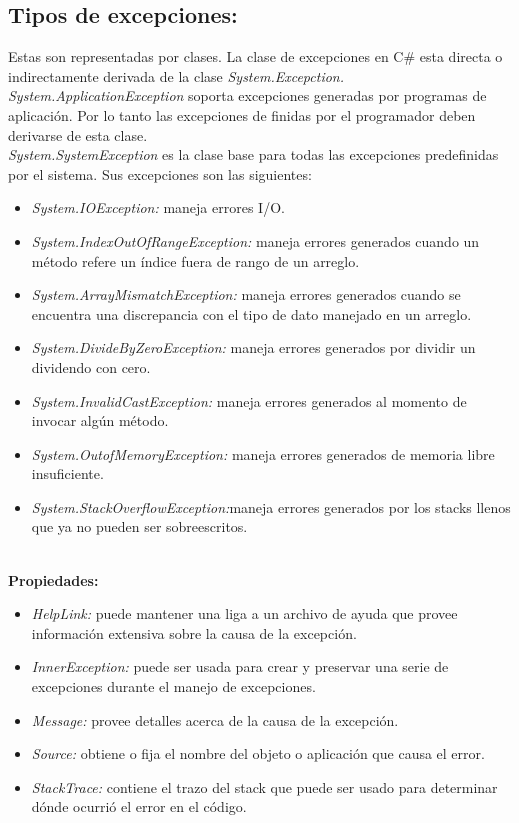 \documentclass[letterpaper, 12pt]{article}
\begin{document}
\begin{justify}
        \subsection{Tipos de excepciones:}
        Estas son representadas por clases. La clase de excepciones en C\# esta directa o indirectamente derivada de la clase \emph{System.Excepction.}
        \newline
        \\
        \emph{System.ApplicationException }soporta excepciones generadas por programas de aplicación. Por lo tanto las excepciones de
        finidas por el programador deben derivarse de esta clase.
        \newline
        \\
        \emph{System.SystemException }es la clase base para todas las excepciones predefinidas por el sistema. Sus excepciones son las siguientes:
        \begin{itemize}
            \item \emph{System.IOException:} maneja errores I/O.
            \item \emph{System.IndexOutOfRangeException:} maneja errores generados cuando un método refere un índice fuera de rango de un arreglo.
            \item \emph{System.ArrayMismatchException: }maneja errores generados cuando se encuentra una discrepancia con el tipo de dato manejado en un arreglo.            \item \emph{System.DivideByZeroException: }maneja errores generados por dividir un dividendo con cero.
            \item \emph{System.InvalidCastException:} maneja errores generados al momento de invocar algún método.
            \item \emph{System.OutofMemoryException: }maneja errores generados de memoria libre insuficiente.
            \item \emph{System.StackOverflowException:}maneja errores generados por los stacks llenos que ya no pueden ser sobreescritos.
        \end{itemize}
        \textbf{\\Propiedades:}
        \begin{itemize}
            \item \emph{HelpLink: }puede mantener una liga a un archivo de ayuda que provee información extensiva sobre la causa de la excepción.
            \item \emph{InnerException: }puede ser usada para crear y preservar una serie de excepciones durante el manejo de excepciones.
            \item \emph{Message: }provee detalles acerca de la causa de la excepción.
            \item \emph{Source: }obtiene o fija el nombre del objeto o aplicación que causa el error.
            \item \emph{StackTrace: }contiene el trazo del stack que puede ser usado para determinar dónde ocurrió el error en el código.
        \end{itemize}


\end{justify}
\end{document}
